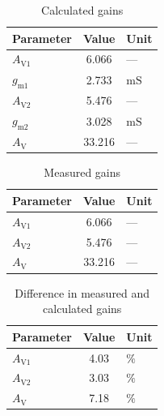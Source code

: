 \documentclass[conference]{IEEEtran}
\newcommand{\Ax}[1]{A_\mathrm{#1}}
\newcommand{\gx}[1]{g_\mathrm{#1}}
\begin{document}
\begin{table}[!t]
    \centering
    \caption{Calculated gains}
    \label{tab:AVcalc}
    \begin{tabular}{l S[table-format=3.3] l}
        \toprule
        Parameter & {Value} & Unit \\
        \midrule
        \(\Ax{V1}\)  & 6.066  & --- \\
        \(\gx{m1}\)  & 2.733  & \(\unit{\milli\siemens}\) \\
        \(\Ax{V2}\)  & 5.476  & --- \\
        \(\gx{m2}\)  & 3.028  & \(\unit{\milli\siemens}\) \\
        \(\Ax{V}\)   & 33.216 & --- \\
        \bottomrule
    \end{tabular}
\end{table}

\begin{table}[!t]
    \centering
    \caption{Measured gains}
    \label{tab:AVmeas}
    \begin{tabular}{l S[table-format=3.3] l}
        \toprule
        Parameter & {Value} & Unit \\
        \midrule
        \(\Ax{V1}\)  & 6.066  & --- \\
        \(\Ax{V2}\)  & 5.476  & --- \\
        \(\Ax{V}\)   & 33.216 & --- \\
        \bottomrule
    \end{tabular}
\end{table}

\begin{table}[!t]
    \centering
    \caption{Difference in measured and calculated gains}
    \label{tab:AVdiff}
    \begin{tabular}{l S[table-format=3.2] l}
        \toprule
        Parameter & {Value} & Unit \\
        \midrule
        \(\Ax{V1}\)  & 4.03 & \(\unit{\percent}\) \\
        \(\Ax{V2}\)  & 3.03 & \(\unit{\percent}\) \\
        \(\Ax{V}\)   & 7.18 & \(\unit{\percent}\) \\
        \bottomrule
    \end{tabular}
\end{table}



\end{document}
